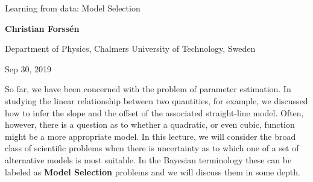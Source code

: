 \documentclass[%
oneside,                 %
final,                   %
10pt]{article}
\begin{document}

\newcommand{\exercisesection}[1]{\subsection*{#1}}







\thispagestyle{empty}

\begin{center}
{\LARGE\bf
\begin{spacing}{1.25}
Learning from data: Model Selection
\end{spacing}
}
\end{center}


\begin{center}
{\bf Christian Forssén}
\end{center}

    \begin{center}
\centerline{{\small Department of Physics, Chalmers University of Technology, Sweden}}
\end{center}
    

\begin{center}
Sep 30, 2019
\end{center}

\vspace{1cm}


So far, we have been concerned with the problem of parameter estimation. In studying the linear relationship between two quantities, for example, we discussed how to infer the slope and the offset of the associated straight-line model. Often, however, there is a question as to whether a quadratic, or even cubic, function might be a more appropriate model. In this lecture, we will consider the broad class of scientific problems when there is uncertainty as to which one of a set of alternative models is most suitable. In the Bayesian terminology these can be labeled as \textbf{Model Selection} problems and we will discuss them in some depth.
\end{document}
